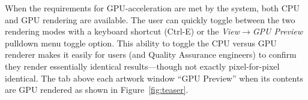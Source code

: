 \ifdefined\NOSHOW
When the requirements for GPU-acceleration are met by the system, both CPU and GPU rendering are available.
The user can quickly toggle between the two rendering modes with a
keyboard shortcut (Ctrl-E) or the {\em View$\rightarrow$GPU Preview}
pulldown menu toggle option.  This ability to toggle the CPU versus GPU renderer
makes it easily for users (and Quality Assurance engineers)
to confirm they render essentially identical results---though not exactly pixel-for-pixel identical.
The tab above each artwork window ``GPU Preview'' when its contents are GPU rendered as shown in Figure~\ref{fig:teaser}.
\fi
